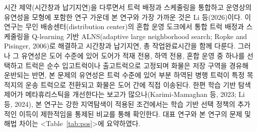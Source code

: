 \documentclass[10pt,a4paper]{article}
\begin{document}
시간 제약(시간창과 납기지연)을 다루면서 트럭 배정과 스케줄링을 통합하고 운영상의 유연성을 모형에 포함한 연구 가운데 본 연구와 가장 가까운 것은 Li 등(2026)이다. 이 연구는 무인 배송센터(distribution center)의 혼합 운영 도크에서
통합 트럭 배정과 스케줄링을 Q-learning 기반 ALNS(adaptive large neighborhood search; Ropke and
Pisinger, 2006)로 해결하고 시간창과 납기지연, 총 작업완료시간을 함께 다룬다. 그러나 그 유연성은
도어 수준에 있어 도어가 적재 전용, 하역 전용, 혼합 운영 중 하나를 선택하고 트럭은 순수 입고트럭이나 출고트럭으로
고정되며 화물은 저장 구역을 경유해 운반되는 반면, 본 문제의 유연성은 트럭 수준에 있어 부분 하역된 병행
트럭이 특정 목적지의 운송 트럭으로 전환되고 화물은 도어 간에 직접 이송된다. 한편 학습 기반 탐색 제어가
메타휴리스틱을 개선한다는 보고가 많으나(Karimi-Mamaghan 등, 2023; Li 등, 2024), 본 연구는 강한 지역탐색이 적용된 조건에서는 학습 기반 선택 정책의 추가적인 이득이 제한적임을 통제된 비교를 통해 확인한다. 대표 연구와 본 연구의 문제 및 해법 차이는 <Table~\ref{tab:pos}>에 요약하였다.
\end{document}
